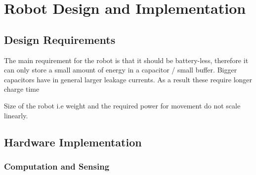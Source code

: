 \chapter{Robot Design and Implementation}


\section{Design Requirements}


The main requirement for the robot is  that it should be battery-less, therefore it can only store a small amount of energy in a capacitor / small buffer.
Bigger capacitors have in general larger leakage currents.
As a result these require longer charge time

Size of the robot i.e weight and the required power for movement do not scale linearly.




	
\section{Hardware Implementation}

 

\subsection{Computation and Sensing}

